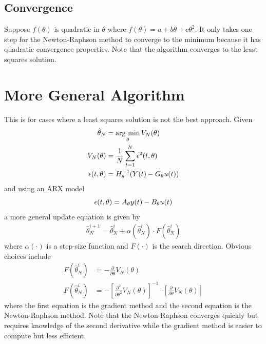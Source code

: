 \subsection{Convergence}
Suppose $f(\theta)$ is quadratic in $\theta$ where $f(\theta)=a+b\theta+c\theta^2$. It only takes one step for the Newton-Raphson method to converge to the minimum because it has quadratic convergence properties. Note that the algorithm converges to the least squares solution.

\section{More General Algorithm}
This is for cases where a least squares solution is not the best approach. Given
\begin{align*}
\hat{\theta}_N &= \mathop{\arg\,\min}\limits_\theta V_N(\theta) \\
V_N(\theta) &= \frac{1}{N}\sum_{t=1}^N\epsilon^2(t,\theta) \\
\epsilon(t,\theta) &= H_\theta^{-1}(Y(t)-G_\theta u(t))
\end{align*}
and using an ARX model
$$\epsilon(t,\theta) = A_\theta y(t)-B_\theta u(t)$$
a more general update equation is given by
\begin{align*}
\boxed{\hat{\theta}_N^{i+1} = \hat{\theta}_N^i + \alpha(\hat{\theta}_N^i)\cdot F(\hat{\theta}_N^i)}
\end{align*}
where $\alpha(\cdot)$ is a step-size function and $F(\cdot)$ is the search direction. Obvious choices include
\begin{align*}
F(\hat{\theta}_N^i) &= -\frac{\partial}{\partial\theta}V_N(\theta) \\
F(\hat{\theta}_N^i) &= -\left[\frac{\partial^2}{\partial\theta^2}V_N(\theta)\right]^{-1}\cdot\left[\frac{\partial}{\partial\theta}V_N(\theta)\right]
\end{align*}
where the first equation is the gradient method and the second equation is the Newton-Raphson method. Note that the Newton-Raphson converges quickly but requires knowledge of the second derivative while the gradient method is easier to compute but less efficient.

